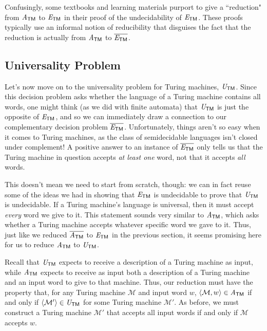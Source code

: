 \begin{remark}
Confusingly, some textbooks and learning materials purport to give a ``reduction" from $\mathit{A}_{\textsf{TM}}$ to $\mathit{E}_{\textsf{TM}}$ in their proof of the undecidability of $\mathit{E}_{\textsf{TM}}$. These proofs typically use an informal notion of reducibility that disguises the fact that the reduction is actually from $\mathit{A}_{\textsf{TM}}$ to $\overline{\mathit{E}_{\textsf{TM}}}$.
\end{remark}

\subsection*{Universality Problem}

Let's now move on to the universality problem for Turing machines, $\mathit{U}_{\textsf{TM}}$. Since this decision problem asks whether the language of a Turing machine contains all words, one might think (as we did with finite automata) that $\mathit{U}_{\textsf{TM}}$ is just the opposite of $\mathit{E}_{\textsf{TM}}$, and so we can immediately draw a connection to our complementary decision problem $\overline{\mathit{E}_{\textsf{TM}}}$. Unfortunately, things aren't so easy when it comes to Turing machines, as the class of semidecidable languages isn't closed under complement! A positive answer to an instance of $\overline{\mathit{E}_{\textsf{TM}}}$ only tells us that the Turing machine in question accepts \emph{at least one} word, not that it accepts \emph{all} words.

This doesn't mean we need to start from scratch, though: we can in fact reuse some of the ideas we had in showing that $\mathit{E}_{\textsf{TM}}$ is undecidable to prove that $\mathit{U}_{\textsf{TM}}$ is undecidable. If a Turing machine's language is universal, then it must accept \emph{every} word we give to it. This statement sounds very similar to $\mathit{A}_{\textsf{TM}}$, which asks whether a Turing machine accepts whatever specific word we gave to it. Thus, just like we reduced $\overline{\mathit{A}_{\textsf{TM}}}$ to $\mathit{E}_{\textsf{TM}}$ in the previous section, it seems promising here for us to reduce $\mathit{A}_{\textsf{TM}}$ to $\mathit{U}_{\textsf{TM}}$.

Recall that $\mathit{U}_{\textsf{TM}}$ expects to receive a description of a Turing machine as input, while $\mathit{A}_{\textsf{TM}}$ expects to receive as input both a description of a Turing machine and an input word to give to that machine. Thus, our reduction must have the property that, for any Turing machine $\mathcal{M}$ and input word $w$, $\langle \mathcal{M}, w \rangle \in \mathit{A}_{\textsf{TM}}$ if and only if $\langle \mathcal{M}' \rangle \in \mathit{U}_{\textsf{TM}}$ for some Turing machine $\mathcal{M}'$. As before, we must construct a Turing machine $\mathcal{M}'$ that accepts all input words if and only if $\mathcal{M}$ accepts $w$.

